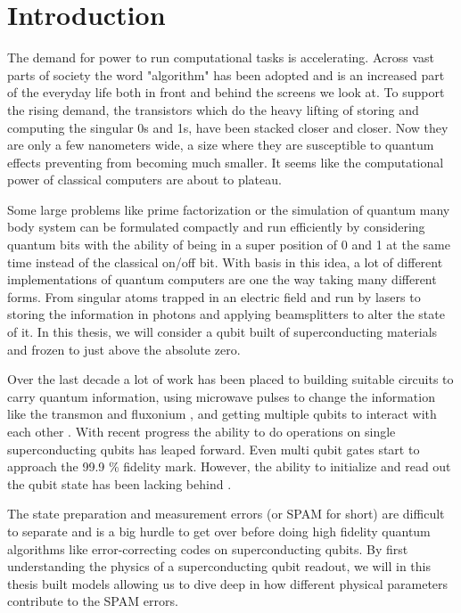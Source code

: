 \chapter{Introduction}
The demand for power to run computational tasks is accelerating. Across vast parts of society the word "algorithm" has been adopted and is an increased part of the everyday life both in front and behind the screens we look at. To support the rising demand, the transistors which do the heavy lifting of storing and computing the singular 0s and 1s, have been stacked closer and closer. Now they are only a few nanometers wide, a size where they are susceptible to quantum effects preventing from becoming much smaller. It seems like the computational power of classical computers are about to plateau.\cite{}

Some large problems like prime factorization or the simulation of quantum many body system can be formulated compactly and run efficiently by considering quantum bits with the ability of being in a super position of 0 and 1 at the same time instead of the classical on/off bit. \cite{} With basis in this idea, a lot of different implementations of quantum computers are one the way taking many different forms. From singular atoms trapped in an electric field and run by lasers \cite{} to storing the information in photons and applying beamsplitters to alter the state of it\cite{}. In this thesis, we will consider a qubit built of superconducting materials and frozen to just above the absolute zero. \cite{}

Over the last decade a lot of work has been placed to building suitable circuits to carry quantum information\cite{}, using microwave pulses to change the information like the transmon \cite{} and fluxonium \cite{}, and getting multiple qubits to interact with each other \cite{}. With recent progress the ability to do operations on single superconducting qubits \cite{} has leaped forward. Even multi qubit gates start to approach the 99.9 \% fidelity mark\cite{}. However, the ability to initialize and read out the qubit state has been lacking behind \cite{}. 

The state preparation and measurement errors (or SPAM for short) are difficult to separate and is a big hurdle to get over before doing high fidelity quantum algorithms like error-correcting codes on superconducting qubits. By first understanding the physics of a superconducting qubit readout, we will in this thesis built models allowing us to dive deep in how different physical parameters contribute to the SPAM errors.



